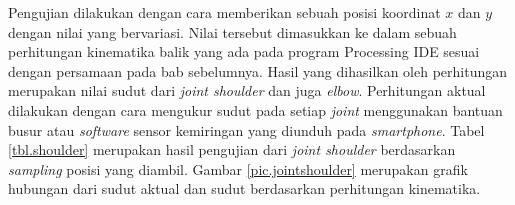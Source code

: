 Pengujian dilakukan dengan cara memberikan sebuah posisi koordinat $x$ dan $y$ dengan nilai yang bervariasi. Nilai tersebut dimasukkan ke dalam sebuah perhitungan kinematika balik yang ada pada program Processing IDE sesuai dengan persamaan pada bab sebelumnya. Hasil yang dihasilkan oleh perhitungan merupakan nilai sudut dari \textit{joint shoulder} dan juga \textit{elbow}. Perhitungan aktual dilakukan dengan cara mengukur sudut pada setiap \textit{joint} menggunakan bantuan busur atau \textit{software} sensor kemiringan yang diunduh pada \textit{smartphone}. Tabel \ref{tbl.shoulder} merupakan hasil pengujian dari \textit{joint shoulder} berdasarkan \textit{sampling} posisi yang diambil. Gambar \ref{pic.jointshoulder} merupakan grafik hubungan dari sudut aktual dan sudut berdasarkan perhitungan kinematika. 
\fontsize{8}{10}\selectfont

